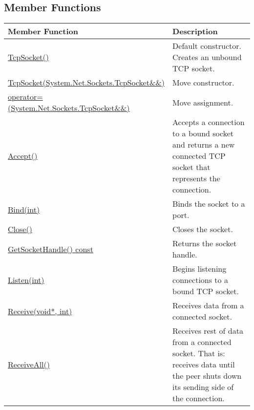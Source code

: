 \documentclass[a4paper,oneside,11.000000pt]{book}
\begin{document}
\subsection{Member Functions}
\begin{flushleft}
\begin{supertabular}[l]{!{\raggedright}p{7.575cm}!{\raggedright}p{7.575cm}}
\textbf{Member Function}
& \textbf{Description}
\\
\hline
\hyperlink{System.Net.Sockets.TcpSocket.constructor.P.System.Net.Sockets.TcpSocket}{TcpSocket()}
& Default constructor. Creates an unbound TCP socket.

\\
\hyperlink{System.Net.Sockets.TcpSocket.constructor.P.System.Net.Sockets.TcpSocket.RR.System.Net.Sockets.TcpSocket}{TcpSocket(System.\-Net.\-Sockets.\-TcpSocket\&\-\&\-)}
& Move constructor.

\\
\hyperlink{System.Net.Sockets.TcpSocket.operator.assign.P.System.Net.Sockets.TcpSocket.RR.System.Net.Sockets.TcpSocket}{operator=(System.\-Net.\-Sockets.\-TcpSocket\&\-\&\-)}
& Move assignment.

\\
\hyperlink{System.Net.Sockets.TcpSocket.Accept.P.System.Net.Sockets.TcpSocket}{Accept()}
& Accepts a connection to a bound socket and returns a new connected TCP socket that represents the connection.

\\
\hyperlink{System.Net.Sockets.TcpSocket.Bind.P.System.Net.Sockets.TcpSocket.int}{Bind(int)}
& Binds the socket to a port.

\\
\hyperlink{System.Net.Sockets.TcpSocket.Close.P.System.Net.Sockets.TcpSocket}{Close()}
& Closes the socket.

\\
\hyperlink{System.Net.Sockets.TcpSocket.GetSocketHandle.C.P.System.Net.Sockets.TcpSocket}{GetSocketHandle() const}
& Returns the socket handle.

\\
\hyperlink{System.Net.Sockets.TcpSocket.Listen.P.System.Net.Sockets.TcpSocket.int}{Listen(int)}
& Begins listening connections to a bound TCP socket.

\\
\hyperlink{System.Net.Sockets.TcpSocket.Receive.P.System.Net.Sockets.TcpSocket.P.void.int}{Receive(void*, int)}
& Receives data from a connected socket.

\\
\hyperlink{System.Net.Sockets.TcpSocket.ReceiveAll.P.System.Net.Sockets.TcpSocket}{ReceiveAll()}
& Receives rest of data from a connected socket.
That is: receives data until the peer shuts down its sending side of the connection.


\end{supertabular}
\end{flushleft}
\end{document}

